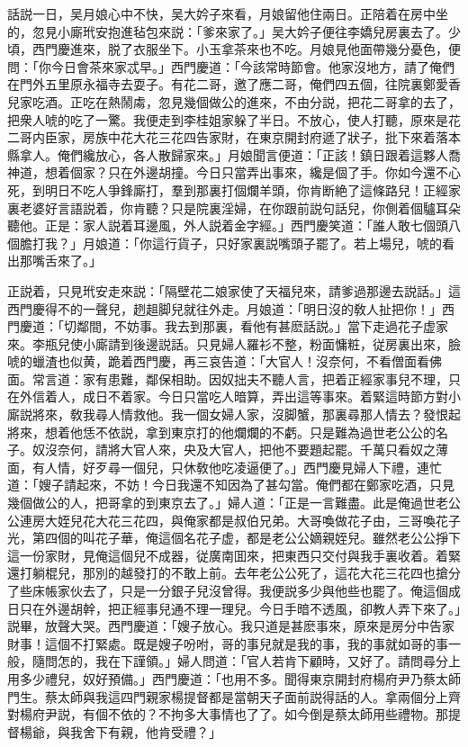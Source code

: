 話説一日，吴月娘心中不快，吴大妗子來看，月娘留他住兩日。正陪着在房中坐的，忽見小廝玳安抱進毡包來説：「爹來家了。」吴大妗子便往李嬌兒房裏去了。少頃，西門慶進來，脱了衣服坐下。小玉拿茶來也不吃。月娘見他面帶幾分憂色，便問：「你今日會茶來家忒早。」西門慶道：「今該常時節會。他家沒地方，請了俺們在門外五里原永福寺去耍子。有花二哥，邀了應二哥，俺們四五個，往院裏鄭愛香兒家吃酒。正吃在熱鬧䖏，忽見幾個做公的進來，不由分説，把花二哥拿的去了，把衆人唬的吃了一驚。我便走到李桂姐家躲了半日。不放心，使人打聽，原來是花二哥内臣家，房族中花大花三花四告家財，在東京開封府遞了狀子，批下來着落本縣拿人。俺們纔放心，各人散歸家來。」月娘聞言便道：「正該！鎮日跟着這夥人喬神道，想着個家？只在外邊胡撞。今日只當弄出事來，纔是個了手。你如今還不心死，到明日不吃人爭鋒廝打，羣到那裏打個爛羊頭，你肯断絶了這條路兒！正經家裏老婆好言語説着，你肯聽？只是院裏淫婦，在你跟前説句話兒，你側着個驢耳朵聽他。正是：家人説着耳邊風，外人説着金字經。」西門慶笑道：「誰人敢七個頭八個膽打我？」月娘道：「你這行貨子，只好家裏説嘴頭子罷了。若上場兒，唬的看出那嘴舌來了。」

正説着，只見玳安走來説：「隔壁花二娘家使了天福兒來，請爹過那邊去説話。」這西門慶得不的一聲兒，趔趄脚兒就往外走。月娘道：「明日沒的敎人扯把你！」西門慶道：「切鄰間，不妨事。我去到那裏，看他有甚麽話説。」當下走過花子虚家來。李瓶兒使小廝請到後邊説話。只見婦人羅衫不整，粉面慵粧，従房裏出來，臉唬的蠟渣也似黄，跪着西門慶，再三哀告道：「大官人！沒奈何，不看僧面看佛面。常言道：家有患難，鄰保相助。因奴拙夫不聽人言，把着正經家事兒不理，只在外信着人，成日不着家。今日只當吃人暗算，弄出這等事來。着緊這時節方對小廝説將來，敎我尋人情救他。我一個女婦人家，沒脚蟹，那裏尋那人情去？發恨起將來，想着他恁不依説，拿到東京打的他爛爛的不虧。只是難為過世老公公的名子。奴沒奈何，請將大官人來，央及大官人，把他不要題起罷。千萬只看奴之薄面，有人情，好歹尋一個兒，只休敎他吃凌逼便了。」西門慶見婦人下禮，連忙道：「嫂子請起來，不妨！今日我還不知因為了甚勾當。俺們都在鄭家吃酒，只見幾個做公的人，把哥拿的到東京去了。」婦人道：「正是一言難盡。此是俺過世老公公連房大姪兒花大花三花四，與俺家都是叔伯兄弟。大哥喚做花子由，三哥喚花子光，第四個的叫花子華，俺這個名花子虚，都是老公公嫡親姪兒。雖然老公公掙下這一份家財，見俺這個兒不成器，従廣南囬來，把東西只交付與我手裏收着。着緊還打躺棍兒，那別的越發打的不敢上前。去年老公公死了，這花大花三花四也搶分了些床帳家伙去了，只是一分銀子兒沒曾得。我便説多少與他些也罷了。俺這個成日只在外邊胡幹，把正經事兒通不理一理兒。今日手暗不透風，卻教人弄下來了。」説畢，放聲大哭。西門慶道：「嫂子放心。我只道是甚麽事來，原來是房分中告家財事！這個不打緊處。既是嫂子吩咐，哥的事兒就是我的事，我的事就如哥的事一般，隨問怎的，我在下謹領。」婦人問道：「官人若肯下顧時，又好了。請問尋分上用多少禮兒，奴好預備。」西門慶道：「也用不多。聞得東京開封府楊府尹乃蔡太師門生。蔡太師與我這四門親家楊提督都是當朝天子面前説得話的人。拿兩個分上齊對楊府尹説，有個不依的？不拘多大事情也了了。如今倒是蔡太師用些禮物。那提督楊爺，與我舍下有親，他肯受禮？」

